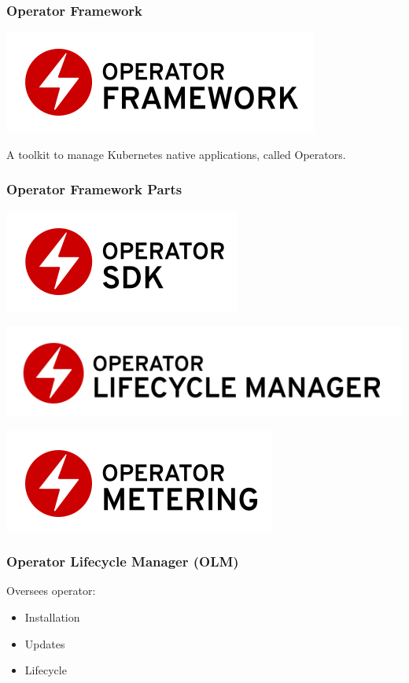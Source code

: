 \documentclass[aspectratio=169]{beamer}
\begin{document}
\begin{frame}
  \frametitle{Operator Framework}

  \includegraphics[scale=.50]{images/operator_logo_framework_color.png}

  A toolkit to manage Kubernetes native applications, called Operators.

\end{frame}

\begin{frame}
  \frametitle{Operator Framework Parts}

  \includegraphics[scale=.50]{images/operator_logo_sdk_color.png}

  \includegraphics[scale=.50]{images/operator_logo_lifecycle_manager_color.png}

  \includegraphics[scale=.50]{images/operator_logo_metering_color.png}

\end{frame}

\begin{frame}
  \frametitle{Operator Lifecycle Manager (OLM)}

  Oversees operator:
  \begin{itemize}
  \item Installation
  \item Updates
  \item Lifecycle
  \end{itemize}

\end{frame}
\end{document}
